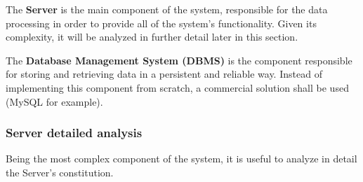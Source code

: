 \documentclass[12pt]{article}
\begin{document}
The \textbf{Server} is the main component of the system, responsible for the data processing in order to provide all of the system's functionality. Given its complexity, it will be analyzed in further detail later in this section.

The \textbf{Database Management System (DBMS)} is the component responsible for storing and retrieving data in a persistent and reliable way. Instead of implementing this component from scratch, a commercial solution shall be used (MySQL for example).

\subsubsection{Server detailed analysis}
Being the most complex component of the system, it is useful to analyze in detail the Server's constitution.
\end{document}
